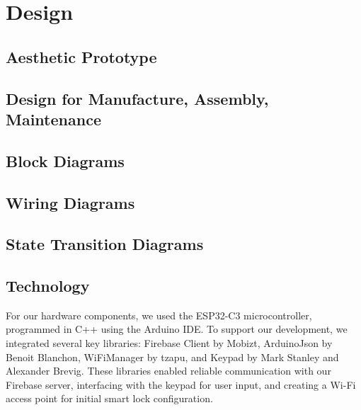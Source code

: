 \newpage

\section{Design}

\begin{comment}
 What is required for the Design Section:
 - Aesthetic Prototype ( CAD Images, photos of physical prototypes, drawings )
 - Design for Manufacture, Assembly, Maintenance
 - Block Diagrams
 - Wiring Diagrams
 - State Transition Diagrams
 - Technology ( languages, hardware, etc. )
 - Simulation
 - Modeling
\end{comment}

\subsection{Aesthetic Prototype} %

\subsection{Design for Manufacture, Assembly, Maintenance} %

\subsection{Block Diagrams}

\subsection{Wiring Diagrams}

\subsection{State Transition Diagrams}

\subsection{Technology}
For our hardware components, we used the ESP32-C3 microcontroller, programmed in C++ using the Arduino IDE. To support our development, we integrated several key libraries: Firebase Client by Mobizt, ArduinoJson by Benoit Blanchon, WiFiManager by tzapu, and Keypad by Mark Stanley and Alexander Brevig. These libraries enabled reliable communication with our Firebase server, interfacing with the keypad for user input, and creating a Wi-Fi access point for initial smart lock configuration. 

